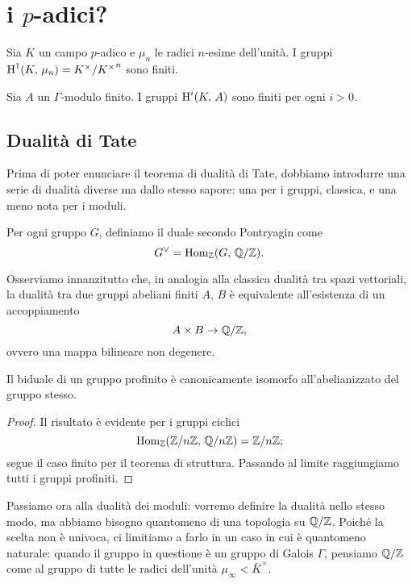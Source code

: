 \chapter{i $ p $-adici?}

\begin{proposition}
	Sia $ K $ un campo $ p $-adico e $ \mu_n $ le radici $ n $-esime dell'unità. I gruppi $ \operatorname{H}^1(K, \, \mu_n) = K^\times / {K^\times}^n $ sono finiti.
\end{proposition}

\begin{corollary} \label{finiti}
	Sia $ A $ un $ \Gamma $-modulo finito. I gruppi $ \operatorname{H}^i(K, \, A) $ sono finiti per ogni $ i > 0 $.
\end{corollary}

\section{Dualità di Tate}
Prima di poter enunciare il teorema di dualità di Tate, dobbiamo introdurre una serie di dualità diverse ma dallo stesso sapore: una per i gruppi, classica, e una meno nota per i moduli.

\begin{definition}
	Per ogni gruppo $ G $, definiamo il duale secondo Pontryagin come
	\[ G^\vee = \operatorname{Hom}_{\mathbb{Z}}(G, \, \mathbb{Q}/\mathbb{Z}). \]
\end{definition}

Osserviamo innanzitutto che, in analogia alla classica dualità tra spazi vettoriali, la dualità tra due gruppi abeliani finiti $ A, \, B $ è equivalente all'esistenza di un accoppiamento
\[ A \times B \to \mathbb{Q}/\mathbb{Z}, \]
ovvero una mappa bilineare non degenere.

\begin{proposition}
	Il biduale di un gruppo profinito è canonicamente isomorfo all'abelianizzato del gruppo stesso. 
\end{proposition}
\begin{proof}
	Il risultato è evidente per i gruppi ciclici
	\[ \operatorname{Hom}_{\mathbb{Z}}(\mathbb{Z}/n\mathbb{Z}, \, \mathbb{Q}/n\mathbb{Z}) = \mathbb{Z}/n\mathbb{Z};  \]
	segue il caso finito per il teorema di struttura. Passando al limite raggiungiamo tutti i gruppi profiniti.
\end{proof}

Passiamo ora alla dualità dei moduli: vorremo definire la dualità nello stesso modo, ma abbiamo bisogno quantomeno di una topologia su $ \mathbb{Q}/\mathbb{Z} $. Poiché la scelta non è univoca, ci limitiamo a farlo in un caso in cui è quantomeno naturale: quando il gruppo in questione è un gruppo di Galois $ \Gamma $, pensiamo $ \mathbb{Q}/\mathbb{Z} $ come al gruppo di tutte le radici dell'unità $ \mu_\infty < \bar{K}^\times $.

